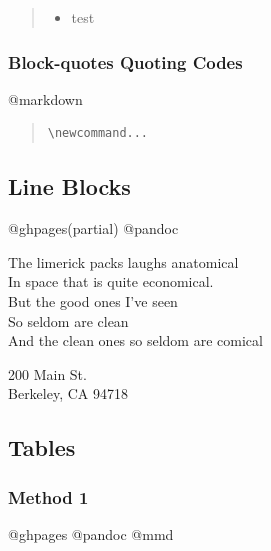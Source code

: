 \documentclass[]{article}
\providecommand{\tightlist}{%
  \setlength{\itemsep}{0pt}\setlength{\parskip}{0pt}}
\begin{document}
\begin{quote}
\begin{itemize}
\tightlist
\item
  test
\end{itemize}
\end{quote}

\subsubsection{Block-quotes Quoting
Codes}\label{block-quotes-quoting-codes}

@markdown

\begin{quote}
\begin{verbatim}
\newcommand...
\end{verbatim}
\end{quote}

\subsection{Line Blocks}\label{line-blocks}

@ghpages(partial) @pandoc

The limerick packs laughs anatomical\\
In space that is quite economical.\\
\hspace*{0.333em}\hspace*{0.333em}\hspace*{0.333em}But the good ones
I've seen\\
\hspace*{0.333em}\hspace*{0.333em}\hspace*{0.333em}So seldom are clean\\
And the clean ones so seldom are comical

200 Main St.\\
Berkeley, CA 94718

\subsection{Tables}\label{tables}

\subsubsection{Method 1}\label{method-1-2}

@ghpages @pandoc @mmd
\end{document}
